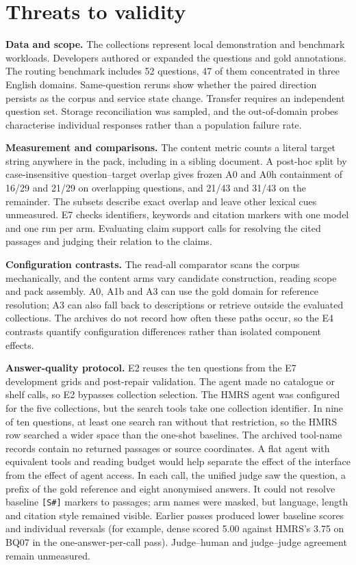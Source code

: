 \section{Threats to validity}
\label{sec:threats}

\noindent\textbf{Data and scope.} The collections represent local
demonstration and benchmark workloads. Developers authored or expanded the
questions and gold annotations. The routing benchmark includes 52 questions, 47 of them concentrated in
three English domains.
Same-question reruns show whether the paired direction persists as the
corpus and service state change. Transfer requires an independent question
set. Storage reconciliation was sampled, and the out-of-domain probes
characterise individual responses rather than a population failure rate.

\noindent\textbf{Measurement and comparisons.} The content metric counts a
literal target string anywhere in the pack, including in a sibling
document. A post-hoc split by case-insensitive question--target overlap
gives frozen A0 and A0h containment of
16/29 and 21/29 on overlapping questions, and 21/43 and 31/43 on the
remainder. The subsets describe exact overlap and leave other lexical
cues unmeasured. E7 checks identifiers,
keywords and citation markers with one model and one run per arm.
Evaluating claim support calls for resolving the cited passages and judging
their relation to the claims.

\noindent\textbf{Configuration contrasts.} The read-all comparator scans the
corpus mechanically, and the content arms vary candidate construction,
reading scope and pack assembly. A0, A1b and A3 can use the gold domain for
reference resolution; A3 can also fall back to descriptions or retrieve
outside the evaluated collections. The archives do not record how often
these paths occur, so the E4 contrasts quantify configuration differences
rather than isolated component effects.

\noindent\textbf{Answer-quality protocol.} E2 reuses the ten questions from
the E7 development grids and post-repair validation. The agent made no
catalogue or shelf calls, so E2 bypasses collection selection. The HMRS agent
was configured for the five collections, but the search tools take one
collection identifier. In nine of ten questions, at least one search ran
without that restriction, so the HMRS row searched a wider space than the
one-shot baselines. The archived tool-name records
contain no returned passages or source coordinates. A flat agent with
equivalent tools and reading budget would
help separate the effect of the interface from the effect of agent access.
In each call, the unified judge saw the question, a prefix of the gold
reference and eight anonymised answers. It could not resolve baseline
\texttt{[S\#]} markers to passages; arm names were masked, but language,
length and citation style remained visible. Earlier passes produced lower
baseline scores and individual reversals (for example, dense scored 5.00
against HMRS's 3.75 on BQ07 in the one-answer-per-call pass). Judge--human
and judge--judge agreement remain unmeasured.

